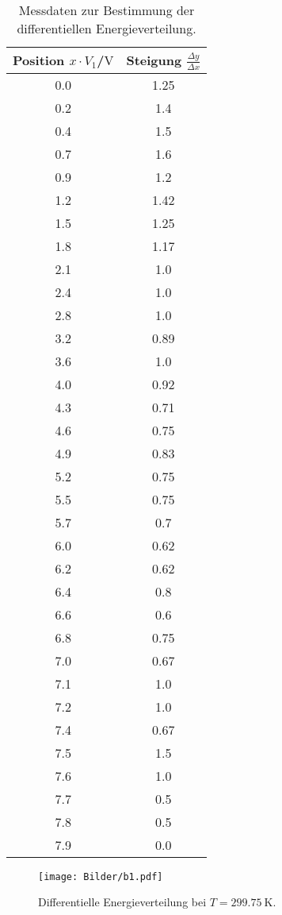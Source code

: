 \begin{table}
	\centering
	\caption{Messdaten zur Bestimmung der differentiellen Energieverteilung.}
	\label{tab:tab2}
\begin{tabular}{cc}
\toprule
Position $x \cdot V_1$/$\si{\volt}$&Steigung $\frac{\Delta y}{\Delta x}$\\
\midrule
0.0 & 1.25 \\
0.2 & 1.4 \\
0.4 & 1.5 \\
0.7 & 1.6 \\
0.9 & 1.2 \\
1.2 & 1.42 \\
1.5 & 1.25 \\
1.8 & 1.17 \\
2.1 & 1.0 \\
2.4 & 1.0 \\
2.8 & 1.0 \\
3.2 & 0.89 \\
3.6 & 1.0 \\
4.0 & 0.92 \\
4.3 & 0.71 \\
4.6 & 0.75 \\
4.9 & 0.83 \\
5.2 & 0.75 \\
5.5 & 0.75 \\
5.7 & 0.7 \\
6.0 & 0.62 \\
6.2 & 0.62 \\
6.4 & 0.8 \\
6.6 & 0.6 \\
6.8 & 0.75 \\
7.0 & 0.67 \\
7.1 & 1.0 \\
7.2 & 1.0 \\
7.4 & 0.67 \\
7.5 & 1.5 \\
7.6 & 1.0 \\
7.7 & 0.5 \\
7.8 & 0.5 \\
7.9 & 0.0 \\
\bottomrule
\end{tabular}
\end{table}
\begin{figure}
  \centering
  \texttt{[image: Bilder/b1.pdf]}
  \caption{Differentielle Energieverteilung bei $T=\SI{299.75}{\kelvin}$.}
  \label{fig:plot}
\end{figure}
